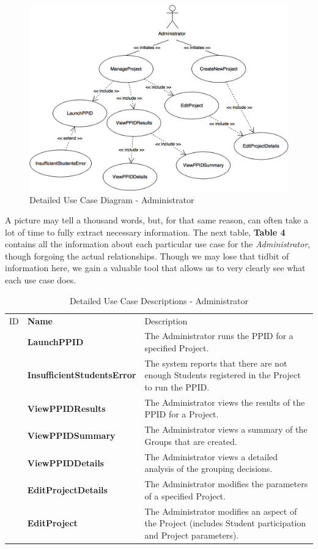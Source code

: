 \documentclass[12pt,letterpaper]{article}
\begin{document}
\begin{figure}[H]
	\centering{}
	\includegraphics[scale=0.26]{imgs/detailed-administrator-use-case-diagram.png}
	\caption{Detailed Use Case Diagram - Administrator}
\end{figure}

A picture may tell a thousand words, but, for that same reason, can often take a lot of time to fully extract necessary information. The next table, {\bf Table 4} contains 
all the information about each particular use case for the {\it Administrator}, though forgoing the actual relationships. Though we may lose that tidbit of information here, we gain a valuable 
tool that allows us to very clearly see what each use case does. 

\begin{table}[H]
	\caption{Detailed Use Case Descriptions - Administrator}
	\begin{tabu} to 
	    \tableheader{}ID & Name & Description\\
		\launchppid{} & LaunchPPID & The Administrator runs the PPID for a specified Project.\\
		\insufficientstudentserror{} & InsufficientStudentsError & The system reports that there are not enough Students registered in the Project to run the PPID.\\
		\viewppidresults{} & ViewPPIDResults & The Administrator views the results of the PPID for a Project.\\
		\viewppidsummary{} & ViewPPIDSummary & The Administrator views a summary of the Groups that are created.\\
		\viewppiddetails{} & ViewPPIDDetails & The Administrator views a detailed analysis of the grouping decisions.\\
		\editprojectdetails{} & EditProjectDetails & The Administrator modifies the parameters of a specified Project.\\
		\editproject{} & EditProject & The Administrator modifies an aspect of the Project (includes Student participation and Project parameters).\\
	\end{tabu}
\end{table}
\end{document}
